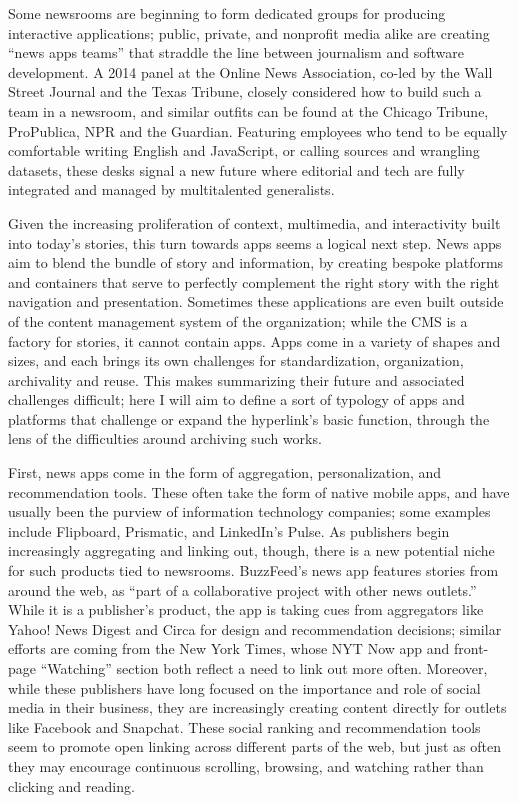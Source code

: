 Some newsrooms are beginning to form dedicated groups for producing interactive applications; public, private, and nonprofit media alike are creating ``news apps teams'' that straddle the line between journalism and software development. A 2014 panel at the Online News Association, co-led by the Wall Street Journal and the Texas Tribune, closely considered how to build such a team in a newsroom, and similar outfits can be found at the Chicago Tribune, ProPublica, NPR and the Guardian. Featuring employees who tend to be equally comfortable writing English and JavaScript, or calling sources and wrangling datasets, these desks signal a new future where editorial and tech are fully integrated and managed by multitalented generalists.

Given the increasing proliferation of context, multimedia, and interactivity built into today's stories, this turn towards apps seems a logical next step. News apps aim to blend the bundle of story and information, by creating bespoke platforms and containers that serve to perfectly complement the right story with the right navigation and presentation. Sometimes these applications are even built outside of the content management system of the organization; while the CMS is a factory for stories, it cannot contain apps. Apps come in a variety of shapes and sizes, and each brings its own challenges for standardization, organization, archivality and reuse. This makes summarizing their future and associated challenges difficult; here I will aim to define a sort of typology of apps and platforms that challenge or expand the hyperlink's basic function, through the lens of the difficulties around archiving such works.

First, news apps come in the form of aggregation, personalization, and recommendation tools. These often take the form of native mobile apps, and have usually been the purview of information technology companies; some examples include Flipboard, Prismatic, and LinkedIn's Pulse. As publishers begin increasingly aggregating and linking out, though, there is a new potential niche for such products tied to newsrooms. BuzzFeed's news app features stories from around the web, as ``part of a collaborative project with other news outlets.''\autocite{o'donovan_buzzfeed_2014} While it is a publisher's product, the app is taking cues from aggregators like Yahoo! News Digest and Circa for design and recommendation decisions; similar efforts are coming from the New York Times, whose NYT Now app and front-page ``Watching'' section both reflect a need to link out more often. Moreover, while these publishers have long focused on the importance and role of social media in their business, they are increasingly creating content directly for outlets like Facebook and Snapchat. These social ranking and recommendation tools seem to promote open linking across different parts of the web, but just as often they may encourage continuous scrolling, browsing, and watching rather than clicking and reading.

